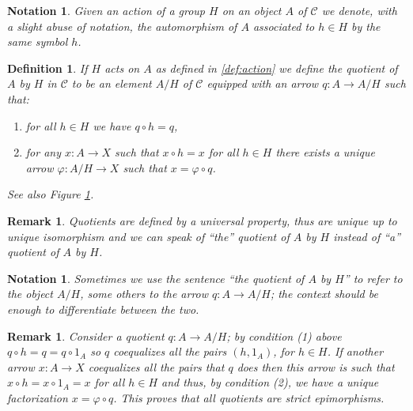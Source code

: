 \documentclass[italian, 12pt, reqno]{article}
\theoremstyle{myteo}
\newtheorem{definition}[theorem]{Definition}
\newtheorem{remark}[theorem]{Remark}
\newtheorem{notation}[theorem]{Notation}
\numberwithin{equation}{section}
\newcommand{\cat}[1]{\mathscr{#1}}
\newcommand{\fun}[3]{#1\colon#2\to #3}
\begin{document}
\begin{notation}
  \label{not:action}
  Given an action of a group \(H\) on an object \(A\) of \(\cat{C}\) we denote, with a slight abuse of notation, the automorphism of \(A\) associated to \(h\in H\) by the same symbol \(h\).
\end{notation}

\begin{definition}
  \label{def:quotient}
  If \(H\) acts on \(A\) as defined in \ref{def:action} we define the quotient of \(A\) by \(H\) in \(\cat{C}\) to be an element \(A/H\) of \(\cat{C}\) equipped with an arrow \(\fun{q}{A}{A/H}\) such that:
  \begin{enumerate}
  \item for all \(h\in H\) we have \(q\circ h = q\),
  \item for any \(\fun{x}{A}{X}\) such that \(x\circ h = x\) for all \(h\in H\) there exists a unique arrow \(\fun{\varphi}{A/H}{X}\) such that \(x = \varphi\circ q\).
  \end{enumerate}
  See also Figure \ref{diagram:quotient}.
\end{definition}

\begin{remark}
  \label{rem:uniqueness_of_quotient}
  Quotients are defined by a universal property, thus are unique up to unique isomorphism and we can speak of ``the'' quotient of \(A\) by \(H\) instead of ``a'' quotient of \(A\) by \(H\).
\end{remark}

\begin{notation}
  \label{not:quotient}
  Sometimes we use the sentence ``the quotient of \(A\) by \(H\)'' to refer to the object \(A/H\), some others to the arrow \(\fun{q}{A}{A/H}\); the context should be enough to differentiate between the two.
\end{notation}

\begin{figure}[h]
  \begin{center}
  \end{center}
  \caption{}
  \label{diagram:quotient}
\end{figure}

\begin{remark}
  \label{rem:quotient_are_strict_epi}
  Consider a quotient \(\fun{q}{A}{A/H}\); by condition (1) above \(q\circ h = q = q\circ 1_A\) so \(q\) coequalizes all the pairs \((h, 1_A)\), for \(h\in H\).
  If another arrow \(\fun{x}{A}{X}\) coequalizes all the pairs that \(q\) does then this arrow is such that \(x\circ h = x\circ 1_A = x\) for all \(h\in H\) and thus, by condition (2), we have a unique factorization \(x = \varphi\circ q\).
  This proves that all quotients are strict epimorphisms.
\end{remark}
\end{document}

